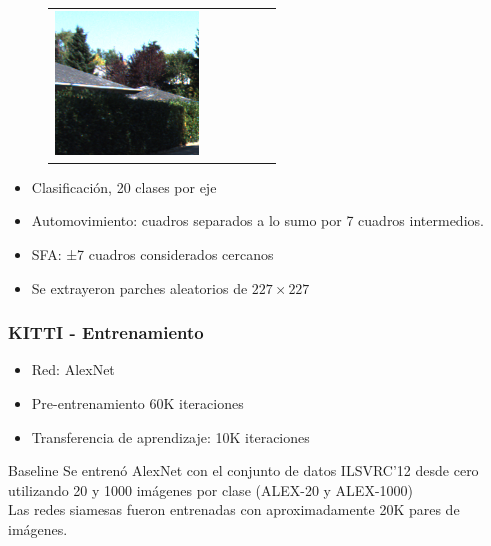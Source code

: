 \documentclass{beamer}
\begin{document}
\begin{frame}[plain]
\begin{figure}
{\begin{tabular}{cccccc}
\includegraphics[width = 1.5in]{./images/kitti/c1.png}\\
\end{tabular}
}
\label{fig:kitti-sample}
\end{figure}
\vfill
\begin{itemize}
    \item Clasificación, 20 clases por eje
    \item Automovimiento: cuadros separados a lo sumo por 7 cuadros intermedios.
    \item SFA: ±7 cuadros considerados cercanos
    \item Se extrayeron parches aleatorios de \(227 \times 227\)
\end{itemize}
\vfill
\end{frame}





\begin{frame}[plain]
\frametitle{KITTI - Entrenamiento}
\vfill
\begin{itemize}
    \item Red: AlexNet
    \item Pre-entrenamiento 60K iteraciones
    \item Transferencia de aprendizaje: 10K iteraciones
\end{itemize}\pause
\vfill
\begin{block}{Baseline}
Se entrenó AlexNet con el conjunto de datos ILSVRC'12 desde cero utilizando 20 y 1000 imágenes por clase (ALEX-20 y ALEX-1000)\\
Las redes siamesas fueron entrenadas con aproximadamente 20K pares de imágenes.
\end{block}\pause
\vfill
\end{frame}
\end{document}
